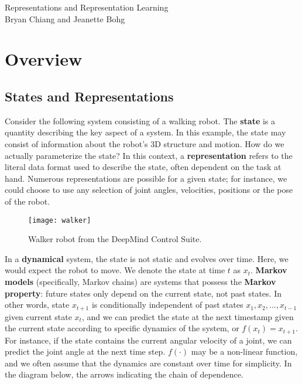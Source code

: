 \documentclass[12pt]{article}
\begin{document}
\begin{center}
{\Large Representations and Representation Learning} \\
\vspace{5mm}
{\large Bryan Chiang and Jeanette Bohg}
\end{center}

\section*{Overview}

\subsection*{States and Representations}

Consider the following system consisting of a walking robot. The \textbf{state} is a quantity describing the key aspect of a system. In this example, the state may consist of information about the robot's 3D structure and motion. How do we actually parameterize the state? In this context, a \textbf{representation} refers to the literal data format used to describe the state, often dependent on the task at hand. Numerous representations are possible for a given state; for instance, we could choose to use any selection of joint angles, velocities, positions or the pose of the robot.

\begin{figure}[H]
  \caption{Walker robot from the DeepMind Control Suite.}
  \centering
  \texttt{[image: walker]}
\end{figure}


In a \textbf{dynamical} system, the state is not static and evolves over time. Here, we would expect the robot to move. We denote the state at time $t$ as $x_{t}$. \textbf{Markov models} (specifically, Markov chains) are systems that possess the \textbf{Markov property}: future states only depend on the current state, not past states. In other words, state $x_{t+1}$ is conditionally independent of past states $x_{1}, x_{2}, \dots, x_{t-1}$ given current state $x_{t}$, and we can predict the state at the next timestamp given the current state according to specific dynamics of the system, or $f(x_{t}) = x_{t+1}$. For instance, if the state contains the current angular velocity of a joint, we can predict the joint angle at the next time step. $f(\cdot)$ may be a non-linear function, and we often assume that the dynamics are constant over time for simplicity. In the diagram below, the arrows indicating the chain of dependence.
\end{document}
